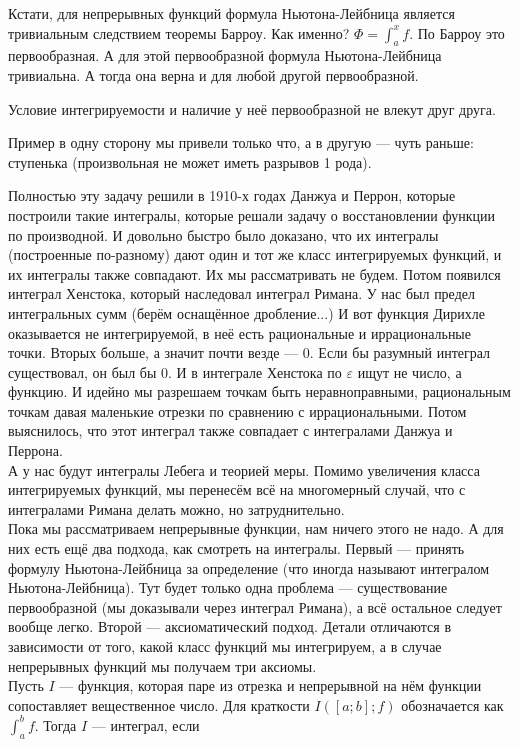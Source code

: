 \documentclass{article}
\begin{document}
\begin{itemize}
\begin{Comment}
            Кстати, для непрерывных функций формула Ньютона-Лейбница является тривиальным следствием теоремы Барроу. Как именно? $\Phi=\int_a^xf$. По Барроу это первообразная. А для этой первообразной формула Ньютона-Лейбница тривиальна. А тогда она верна и для любой другой первообразной.
        \end{Comment}
        \thm Условие интегрируемости и наличие у неё первообразной не влекут друг друга.
        \begin{Proof}
            Пример в одну сторону мы привели только что, а в другую --- чуть раньше: ступенька (произвольная не может иметь разрывов 1 рода).
        \end{Proof}
        \begin{Comment}
            Полностью эту задачу решили в 1910-х годах Данжуа и Перрон, которые построили такие интегралы, которые решали задачу о восстановлении функции по производной. И довольно быстро было доказано, что их интегралы (построенные по-разному) дают один и тот же класс интегрируемых функций, и их интегралы также совпадают. Их мы рассматривать не будем. Потом появился интеграл Хенстока, который наследовал интеграл Римана. У нас был предел интегральных сумм (берём оснащённое дробление...) И вот функция Дирихле оказывается не интегрируемой, в неё есть рациональные и иррациональные точки. Вторых больше, а значит почти везде --- 0. Если бы разумный интеграл существовал, он был бы 0. И в интеграле Хенстока по $\varepsilon$ ищут не число, а функцию. И идейно мы разрешаем точкам быть неравноправными, рациональным точкам давая маленькие отрезки по сравнению с иррациональными. Потом выяснилось, что этот интеграл также совпадает с интегралами Данжуа и Перрона.\\
            А у нас будут интегралы Лебега и теорией меры. Помимо увеличения класса интегрируемых функций, мы перенесём всё на многомерный случай, что с интегралами Римана делать можно, но затруднительно.\\
            Пока мы рассматриваем непрерывные функции, нам ничего этого не надо. А для них есть ещё два подхода, как смотреть на интегралы. Первый --- принять формулу Ньютона-Лейбница за определение (что иногда называют интегралом Ньютона-Лейбница). Тут будет только одна проблема --- существование первообразной (мы доказывали через интеграл Римана), а всё остальное следует вообще легко. Второй --- аксиоматический подход. Детали отличаются в зависимости от того, какой класс функций мы интегрируем, а в случае непрерывных функций мы получаем три аксиомы.\\ Пусть $I$ --- функция, которая паре из отрезка и непрерывной на нём функции сопоставляет вещественное число. Для краткости $I([a;b];f)$ обозначается как $\int_a^bf$. Тогда $I$ --- интеграл, если

\end{Comment}
\end{itemize}
\end{document}
